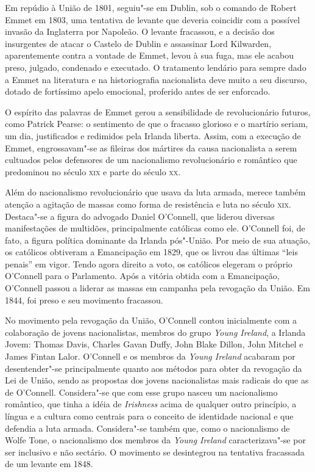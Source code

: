 Em repúdio à União de 1801, seguiu"-se em Dublin, sob o comando de Robert
Emmet em 1803, uma tentativa de levante que deveria coincidir com a
possível invasão da Inglaterra por Napoleão. O levante fracassou, e a
decisão dos insurgentes de atacar o Castelo de Dublin e assassinar Lord
Kilwarden, aparentemente contra a vontade de Emmet, levou à sua fuga,
mas ele acabou preso, julgado, condenado e executado. O tratamento
lendário para sempre dado a Emmet na literatura e na historiografia
nacionalista deve muito a seu discurso, dotado de fortíssimo apelo
emocional, proferido antes de ser enforcado. 

O espírito das palavras de Emmet gerou a sensibilidade de revolucionário
futuros, como Patrick Pearse: o sentimento de que o fracasso glorioso e
o martírio seriam, um dia, justificados e redimidos pela Irlanda
liberta. Assim, com a execução de Emmet, engrossavam"-se as fileiras dos
mártires da causa nacionalista a serem cultuados pelos defensores de um
nacionalismo revolucionário e romântico que predominou no século \textsc{xix} e
parte do século \textsc{xx}. 

Além do nacionalismo revolucionário que usava da luta armada, merece
também atenção a agitação de massas como forma de resistência e luta no
século \textsc{xix}. Destaca"-se a figura do advogado Daniel O’Connell, que
liderou diversas manifestações de multidões, principalmente católicas
como ele. O’Connell foi, de fato, a figura política dominante da
Irlanda pós"-União. Por meio de sua atuação, os católicos obtiveram a
Emancipação em 1829, que os livrou das últimas “leis penais” em vigor.
Tendo agora direito a voto, os católicos elegeram o próprio O’Connell
para o Parlamento. Após a vitória obtida com a Emancipação, O’Connell
passou a liderar as massas em campanha pela revogação da União. Em
1844, foi preso e seu movimento fracassou.

No movimento pela revogação da União, O’Connell contou inicialmente com
a colaboração de jovens nacionalistas, membros do grupo \textit{Young
Ireland}, a Irlanda Jovem: Thomas Davis, Charles Gavan Duffy,
John Blake Dillon, John Mitchel e James Fintan Lalor. O’Connell e os
membros da \textit{Young Ireland} acabaram por desentender"-se
principalmente quanto aos métodos para obter da revogação da Lei de
União, sendo as propostas dos jovens nacionalistas mais radicais do que
as de O’Connell. Considera"-se que com esse grupo nasceu um nacionalismo
romântico, que tinha a idéia de \textit{Irishness} acima de qualquer
outro princípio, a língua e a cultura como centrais para o conceito de
identidade nacional e que defendia a luta armada. Considera"-se também
que, como o nacionalismo de Wolfe Tone, o nacionalismo dos membros da
\textit{Young Ireland} caracterizava"-se por ser inclusivo e não
sectário. O movimento se desintegrou na tentativa fracassada de um
levante em 1848.

